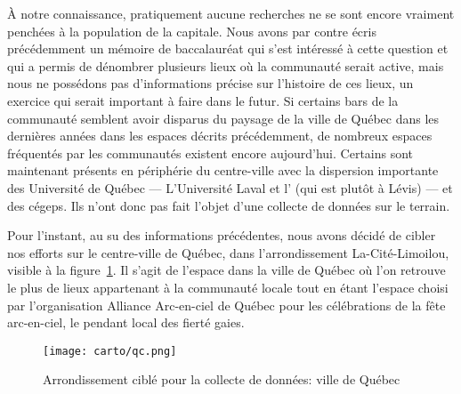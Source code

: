À notre connaissance, pratiquement aucune recherches ne se sont encore vraiment penchées à la population \lgbt{} de la capitale. 
Nous avons par contre écris précédemment un mémoire de baccalauréat qui s'est intéressé à cette question et qui a permis de dénombrer plusieurs lieux où la communauté serait active, mais nous ne possédons pas d'informations précise sur l'histoire de ces lieux, un exercice qui serait important à faire dans le futur. 
Si certains bars de la communauté semblent avoir disparus du paysage de la ville de Québec dans les dernières années dans les espaces décrits précédemment, de nombreux espaces fréquentés par les communautés \lgbt{} existent encore aujourd'hui. 
Certains sont maintenant présents en périphérie du centre-ville avec la dispersion importante des Université de Québec --- L'Université Laval et l'\uqar{} (qui est plutôt à Lévis) --- et des cégeps. 
Ils n'ont donc pas fait l'objet d'une collecte de données sur le terrain.

Pour l'instant, au su des informations précédentes, nous avons décidé de cibler nos efforts sur le centre-ville de Québec, dans l'arrondissement La-Cité-Limoilou, visible à la figure~\ref{fig:espaces_quebec}. 
Il s'agit de l'espace dans la ville de Québec où l'on retrouve le plus de lieux appartenant à la communauté \lgbt{} locale tout en étant l'espace choisi par l'organisation Alliance Arc-en-ciel de Québec pour les célébrations de la fête arc-en-ciel, le pendant local des fierté gaies.

\label{ssub:la_ville_de_quebec}
\begin{figure}[ht]
	\centering
	\texttt{[image: carto/qc.png]}
	\caption{Arrondissement ciblé pour la collecte de données: ville de
    Québec}\label{fig:espaces_quebec}
\end{figure}


